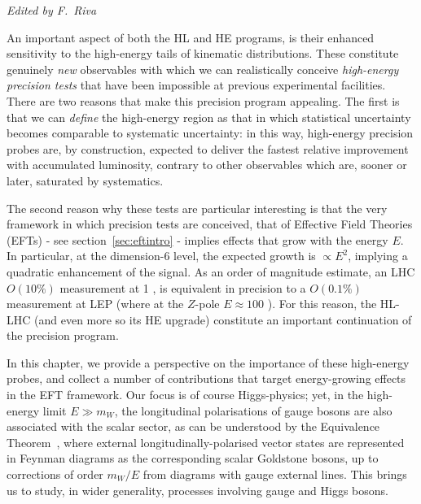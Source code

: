 
\begin{center}
  {\it   Edited by F.~Riva }
\end{center}

An important aspect of both the HL and HE programs, is their enhanced sensitivity to the high-energy tails of kinematic distributions.  
These constitute genuinely \emph{new} observables with which we can realistically  conceive \emph{high-energy precision tests} that have been impossible at previous experimental facilities.
 There are two reasons that make this precision program appealing. The first is that we can \emph{define} the high-energy region as that in which statistical uncertainty becomes comparable to systematic uncertainty: in this way, high-energy precision probes are, by construction, expected to deliver the fastest relative improvement with accumulated luminosity, contrary to other observables which are, sooner or later, saturated by systematics.

The second reason why these tests are particular interesting is that the very framework in which precision tests are conceived, that of Effective Field Theories (EFTs) -   see section~\ref{sec:eftintro} -  implies effects that grow with the energy $E$. In particular, at the dimension-6 level, the expected growth is $\propto E^2$, implying a quadratic enhancement of the signal. 
As an order of magnitude estimate, an LHC $O(10\%)$ measurement at 1 \UTeV, is equivalent in precision to a $O(0.1\%)$ measurement at LEP (where at the $Z$-pole $E\approx 100$ \UGeV). For this reason, the HL-LHC (and even more so its HE upgrade) constitute an important continuation of the precision program. 

In this chapter, we provide a perspective on the importance of these high-energy probes, and collect a number of contributions that target energy-growing effects in the EFT framework.
Our focus is of course Higgs-physics; yet, in the  high-energy  limit $E\gg m_{W}$, the longitudinal polarisations of gauge bosons are also associated with the scalar sector, as can be understood by the Equivalence Theorem~\cite{Chanowitz:1985hj,Wulzer:2013mza}, where external longitudinally-polarised vector states are represented in Feynman diagrams as the corresponding
scalar Goldstone bosons, up to corrections of order $m_W/E$ from diagrams with gauge external lines.
This brings us to study, in wider generality, processes involving gauge  and Higgs bosons. %

